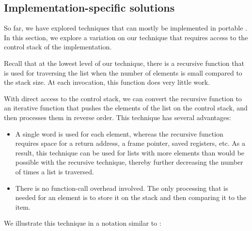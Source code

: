 


\subsection{Implementation-specific solutions}

So far, we have explored techniques that can mostly be implemented in
portable \commonlisp{}.  In this section, we explore a variation on
our technique that requires access to the control stack of the
implementation.

Recall that at the lowest level of our technique, there is a recursive
function that is used for traversing the list when the number of
elements is small compared to the stack size.  At each invocation,
this function does very little work.

With direct access to the control stack, we can convert the recursive
function to an iterative function that pushes the elements of the list
on the control stack, and then processes them in reverse order.  This
technique has several advantages:

\begin{itemize}
\item A single word is used for each element, whereas the recursive
  function requires space for a return address, a frame pointer,
  saved registers, etc.  As a result, this technique can be used for
  lists with more elements than would be possible with the recursive
  technique, thereby further decreasing the number of times a list is
  traversed.
\item There is no function-call overhead involved.  The only
  processing that is needed for an element is to store it on the stack
  and then comparing it to the item.
\end{itemize}

We illustrate this technique in a notation similar to \commonlisp{}:

